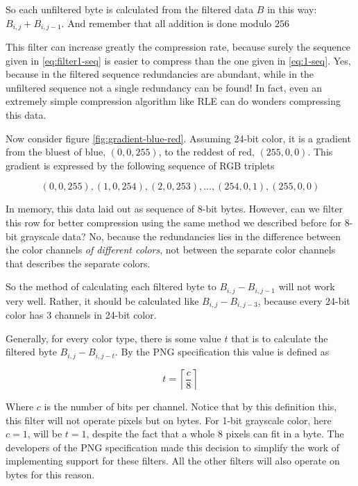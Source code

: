 So each unfiltered byte is calculated from the filtered data $B$ in
this way:  $B_{i,j} + B_{i,j-1}$. And remember that all addition is
done modulo $256$

This filter can increase greatly the compression rate, because surely
the sequence given in \ref{eq:filter1-seq} is easier to compress than
the one given in \ref{eq:1-seq}. Yes, because in the filtered sequence
redundancies are abundant, while in the unfiltered sequence not a
single redundancy can be found! In fact, even an extremely simple
compression algorithm like RLE can do wonders compressing this data.

Now consider figure \ref{fig:gradient-blue-red}. Assuming 24-bit
color, it is a gradient from the bluest of blue, $(0,0,255)$, to the
reddest of red, $(255,0,0)$. This gradient is expressed by the
following sequence of RGB triplets

\begin{equation*}
  (0,0,255), (1,0,254), (2,0,253), \dots, (254,0,1), (255,0,0)
\end{equation*}

In memory, this data laid out as sequence of 8-bit bytes. However, can
we filter this row for better compression using the same method we
described before for 8-bit grayscale data? No, because the
redundancies lies in the difference between the color channels
\textit{of different colors}, not between the separate color channels
that describes the separate colors.

So the method of calculating each filtered byte to $B_{i,j} -
B_{i,j-1}$ will not work very well. Rather, it should be calculated
like $B_{i,j} - B_{i,j-3}$, because every 24-bit color has $3$
channels in 24-bit color.

Generally, for every color type, there is some value $t$ that is to
calculate the filtered byte $B_{i,j} - B_{i,j-t}$. By the PNG
specification this value is defined as

\begin{equation*}
  t = \left\lceil \frac{c}{8} \right\rceil
\end{equation*}

Where $c$ is the number of bits per channel. Notice that by this
definition this, this filter will not operate pixels but on bytes. For
1-bit grayscale color, here $c=1$, will be $t=1$, despite the fact
that a whole $8$ pixels can fit in a byte. The developers of the PNG
specification made this decision to simplify the work of implementing
support for these filters. All the other filters will also operate on
bytes for this reason.

